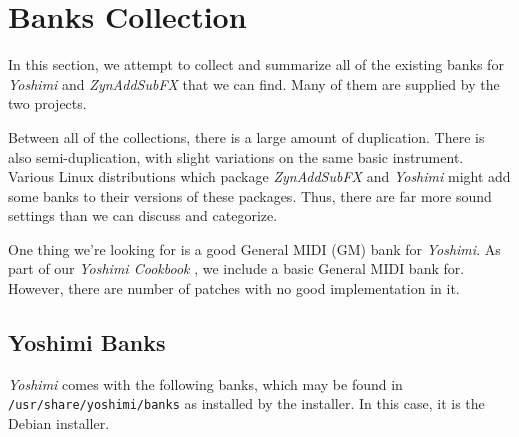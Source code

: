 %
%
%

\section{Banks Collection}
\label{sec:banks_collection}

   In this section, we attempt to collect and summarize all of the existing
   banks for \textsl{Yoshimi} and \textsl{ZynAddSubFX}
   that we can find.  Many of them
   are supplied by the two projects.

   Between all of the collections, there is a large amount of duplication.
   There is also semi-duplication, with slight variations on the same basic
   instrument.
   Various Linux distributions which package \textsl{ZynAddSubFX}
   and \textsl{Yoshimi}
   might add some banks to their versions of these packages.
   Thus, there are far more sound settings than we can discuss and categorize.

   One thing we're looking for is a good General MIDI (GM) bank for
   \textsl{Yoshimi}.  As part of our \textsl{Yoshimi Cookbook}
   \cite{cookbook}, we include a basic General MIDI bank for.
   However, there are number of patches with no good implementation in it.

\subsection{Yoshimi Banks}
\label{subsec:banks_collection_yoshimi}

   \textsl{Yoshimi} comes with the following banks, which may be found in
   \texttt{/usr/share/yoshimi/banks} as installed by the installer.  In this
   case, it is the Debian installer.

